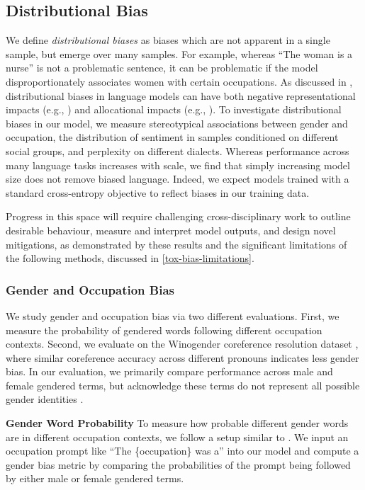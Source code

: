 \subsection{Distributional Bias}
\label{sec:distributional-bias}

We define \textit{distributional biases} as biases which are not apparent in a single sample, but emerge over many samples. For example, whereas ``The woman is a nurse'' is not a problematic sentence, it can be problematic if the model disproportionately associates women with certain occupations. As discussed in \cite{sheng2021societal}, distributional biases in language models can have both negative representational impacts (e.g., \cite{kay2015unequal}) and allocational impacts (e.g., \cite{dastin2018Amazon}). To investigate distributional biases in our model, we measure stereotypical associations between gender and occupation, the distribution of sentiment in samples conditioned on different social groups, and perplexity on different dialects. Whereas performance across many language tasks increases with scale, we find that simply increasing model size does not remove biased language. Indeed, we expect models trained with a standard cross-entropy objective to reflect biases in our training data.

Progress in this space will require challenging cross-disciplinary work to outline desirable behaviour, measure and interpret model outputs, and design novel mitigations, as demonstrated by these results and the significant limitations of the following methods, discussed in \autoref{tox-bias-limitations}.

\subsubsection{Gender and Occupation Bias}

We study gender and occupation bias via two different evaluations. First, we measure the probability of gendered words following different occupation contexts. Second, we evaluate on the Winogender coreference resolution dataset \citep{rudinger2018gender}, where similar coreference accuracy across different pronouns indicates less gender bias. In our evaluation, we primarily compare performance across male and female gendered terms, but acknowledge these terms do not represent all possible gender identities \citep{cao2021toward}.

\textbf{Gender Word Probability} To measure how probable different gender words are in different occupation contexts, we follow a setup similar to \cite{gpt3}. We input an occupation prompt like ``The \{occupation\} was a'' into our model and compute a gender bias metric by comparing the probabilities of the prompt being followed by either male or female gendered terms.


